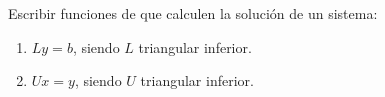 \begin{enunciado}{\ejercicio}
  Escribir funciones de \python que calculen la solución de un sistema:
  \begin{enumerate}[label=(\alph*)]
    \item $Ly = b$, siendo $L$ triangular inferior.
    \item $Ux = y$, siendo $U$ triangular inferior.
  \end{enumerate}
\end{enunciado}

\hacer
